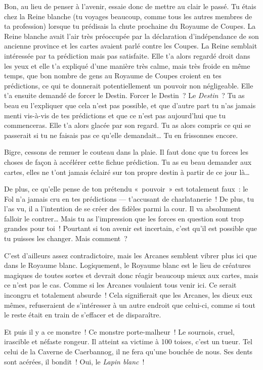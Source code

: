 {{Bon, au lieu de penser à l’avenir, essaie donc de mettre au clair le passé.
Tu étais chez la Reine blanche (tu voyages beaucoup, comme tous les autres membres de ta profession) lorsque tu prédisais la chute prochaine du Royaume de Coupes.
La Reine blanche avait l’air très préoccupée par la déclaration d’indépendance de son ancienne province et les cartes avaient parlé contre les Coupes.
La Reine semblait intéressée par ta prédiction mais pas satisfaite.
Elle t’a alors regardé droit dans les yeux et elle t’a expliqué d’une manière très calme, mais très froide en même temps, que bon nombre de gens au Royaume de Coupes croient en tes prédictions, ce qui te donnerait potentiellement un pouvoir non négligeable.
Elle t’a ensuite demandé de forcer le Destin.
Forcer le Destin~?  Le \emph{Destin}~?
Tu as beau eu l’expliquer que cela n’est pas possible, et que d’autre part tu n’as jamais menti vis-à-vis de tes prédictions et que ce n’est pas aujourd’hui que tu commenceras.
Elle t’a alors glacée par son regard.
Tu as alors compris ce qui se passerait si tu ne faisais pas ce qu’elle demandait…  Tu en frissonnes encore.

Bigre, cessons de remuer le couteau dans la plaie.
Il faut donc que tu forces les choses de façon à accélérer cette fichue prédiction.
Tu as eu beau demander aux cartes, elles ne t’ont jamais éclairé sur ton propre destin à partir de ce jour là…

De plus, ce qu’elle pense de ton prétendu «~pouvoir~» est totalement faux~:  le Fol n’a jamais cru en tes prédictions — t’accusant de charlatanerie~!
De plus, tu l’as vu, il a l’intention de se créer des fidèles parmi la cour.
Il va absolument falloir le contrer…  Mais tu as l’impression que les forces en question sont trop grandes pour toi~!
Pourtant si ton avenir est incertain, c’est qu’il est possible que tu puisses les changer.  Mais comment~?

C’est d’ailleurs assez contradictoire, mais les Arcanes semblent vibrer plus ici que dans le Royaume blanc.
Logiquement, le Royaume blanc est le lieu de créatures magiques de toutes sortes et devrait donc réagir beaucoup mieux aux cartes, mais ce n’est pas le cas.
Comme si les Arcanes voulaient tous venir ici.
Ce serait incongru et totalement absurde~!
Cela signifierait que les Arcanes, les dieux eux mêmes, refuseraient de s’intéresser à un autre endroit que celui-ci, comme si tout le reste était en train de s’effacer et de disparaître.

Et puis il y a ce monstre~!
Ce monstre porte-malheur~!
Le sournois, cruel, irascible et néfaste rongeur.
Il atteint sa victime à 100 toises, c’est un tueur.
Tel celui de la Caverne de Caerbannog, il ne fera qu’une bouchée de nous.
Ses dents sont acérées, il bondit~!
Oui, le \emph{Lapin blanc}~!

}}
